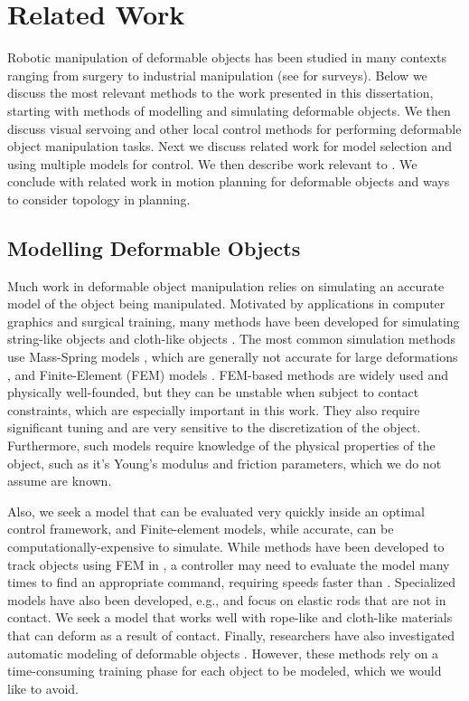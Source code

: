 \chapter{Related Work}

Robotic manipulation of deformable objects has been studied in many contexts ranging from surgery to industrial manipulation (see \cite{Khalil2010, Jimenez2012, Sanchez2018deformablesurvey} for surveys). Below we discuss the most relevant methods to the work presented in this dissertation, starting with methods of modelling and simulating deformable objects. We then discuss visual servoing and other local control methods for performing deformable object manipulation tasks. Next we discuss related work for model selection and using multiple models for control. We then describe work relevant to . We conclude with related work in motion planning for deformable objects and ways to consider topology in planning.


\section{Modelling Deformable Objects}

Much work in deformable object manipulation relies on simulating an accurate model of the object being manipulated. Motivated by applications in computer graphics and surgical training, many methods have been developed for simulating string-like objects \cite{Bergou2008, Rungjiratananon2011} and cloth-like objects \cite{Baraff1998, Goldenthal2007}. The most common simulation methods use Mass-Spring models \cite{Gibson1997, Essahbi2012}, which are generally not accurate for large deformations \cite{Maris2010}, and Finite-Element (FEM) models \cite{Muller2002, Irving2004, Kaufmann2008}. FEM-based methods are widely used and physically well-founded, but they can be unstable when subject to contact constraints, which are especially important in this work. They also require significant tuning and are very sensitive to the discretization of the object. Furthermore, such models require knowledge of the physical properties of the object, such as it's Young's modulus and friction parameters, which we do not assume are known.

Also, we seek a model that can be evaluated very quickly inside an optimal control framework, and Finite-element models, while accurate, can be computationally-expensive to simulate. While methods have been developed to track objects using FEM in  \cite{Petit2017}, a controller may need to evaluate the model many times to find an appropriate command, requiring speeds faster than . Specialized models have also been developed, e.g., \cite{Borum2014} and \cite{Bretl2014} focus on elastic rods that are not in contact. We seek a model that works well with rope-like and cloth-like materials that can deform as a result of contact. Finally, researchers have also investigated automatic modeling of deformable objects \cite{Lang2002, Cretu2008}. However, these methods rely on a time-consuming training phase for each object to be modeled, which we would like to avoid.

